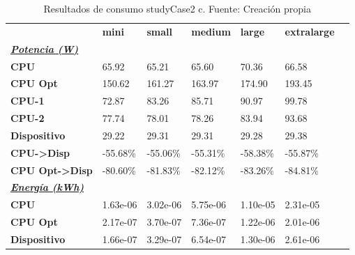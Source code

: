 \begin{table}[H]
    \centering
    \begin{tabular}{lllllll}
    \rowcolor[HTML]{DAE8FC} \ & \textbf{mini} & \textbf{small} & \textbf{medium} & \textbf{	large} & \textbf{	extralarge} \\
    \cellcolor[HTML]{DAE8FC} \textbf{\textbf{{\emph{{\underline{{Potencia (W)}}}}}}} &  &  &  & 	 & 	 \\
    \rowcolor[HTML]{EFEFEF} \cellcolor[HTML]{DAE8FC} \textbf{CPU} & 65.92 & 65.21 & 65.60 & 	70.36 & 	66.58 \\
    \cellcolor[HTML]{DAE8FC} \textbf{CPU Opt} & 150.62 & 161.27 & 163.97 & 	174.90 & 	193.45 \\
    \rowcolor[HTML]{EFEFEF} \cellcolor[HTML]{DAE8FC} \textbf{\quad CPU-1} & 72.87 & 83.26 & 85.71 & 	90.97 & 	99.78 \\
    \cellcolor[HTML]{DAE8FC} \textbf{\quad CPU-2} & 77.74 & 78.01 & 78.26 & 	83.94 & 	93.68 \\
    \rowcolor[HTML]{EFEFEF} \cellcolor[HTML]{DAE8FC} \textbf{Dispositivo} & 29.22 & 29.31 & 29.31 & 	29.28 & 	29.38 \\
    \cellcolor[HTML]{DAE8FC} \textbf{CPU->Disp} & -55.68\% & -55.06\% & -55.31\% & 	-58.38\% & 	-55.87\% \\
    \rowcolor[HTML]{EFEFEF} \cellcolor[HTML]{DAE8FC} \textbf{CPU Opt->Disp} & -80.60\% & -81.83\% & -82.12\% & 	-83.26\% & 	-84.81\% \\
    \cellcolor[HTML]{DAE8FC} \textbf{\textbf{{\emph{{\underline{{Energía (kWh)}}}}}}} &  &  &  & 	 & 	 \\
    \rowcolor[HTML]{EFEFEF} \cellcolor[HTML]{DAE8FC} \textbf{CPU} & 1.63e-06 & 3.02e-06 & 5.75e-06 & 	1.10e-05 & 	2.31e-05 \\
    \cellcolor[HTML]{DAE8FC} \textbf{CPU Opt} & 2.17e-07 & 3.70e-07 & 7.36e-07 & 	1.22e-06 & 	2.01e-06 \\
    \rowcolor[HTML]{EFEFEF} \cellcolor[HTML]{DAE8FC} \textbf{Dispositivo} & 1.66e-07 & 3.29e-07 & 6.54e-07 & 	1.30e-06 & 	2.61e-06 \\
    \end{tabular}
    \caption[Resultados de consumo studyCase2 c]{{Resultados de consumo studyCase2 c. Fuente: Creación propia}}
    \label{table_test_studyCase2_c_hw_powerResults}
\end{table}